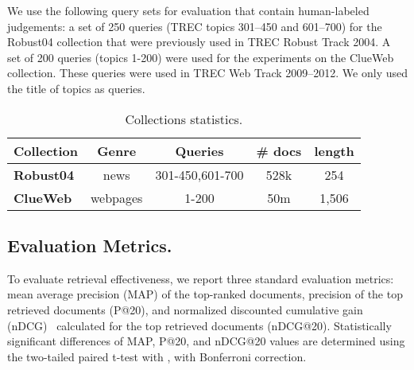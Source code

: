 \documentclass[sigconf]{acmart}
\begin{document}
We use the following query sets for evaluation that contain human-labeled judgements: a set of 250 queries (TREC topics 301--450 and 601--700) for the Robust04 collection that were previously used in TREC Robust Track 2004. A set of 200 queries (topics 1-200) were used for the experiments on the ClueWeb collection. These queries were used in TREC Web Track 2009--2012. We only used the title of topics as queries.

\begin{table}
\centering
\caption{Collections statistics.}
\vspace{-10pt}
\begin{tabularx}{\linewidth}{Xcccc} 
\toprule
\bf Collection & \bf Genre & \bf Queries & \bf \# docs & \bf length  \\ \midrule
\bf Robust04 & news  & 301-450,601-700 & 528k & 254  \\ \bf ClueWeb & webpages & 1-200 & 50m & 1,506  \\ 
\bottomrule
\end{tabularx}
\label{tab:data}
\vspace{-15pt}
\end{table} 
\subsection{Evaluation Metrics.}
To evaluate retrieval effectiveness, we report three standard evaluation metrics: mean average precision (MAP) of the top-ranked  documents, precision of the top  retrieved documents (P@20), and normalized discounted cumulative gain (nDCG)~\citep{Jarvelin:2002} calculated for the top  retrieved documents (nDCG@20). Statistically significant differences of MAP, P@20, and nDCG@20 values are determined using the two-tailed paired t-test with , with Bonferroni correction.
\newcommand{\ps}{}
\newcommand{\ns}{}
\newcommand{\fs}{}
\end{document}
